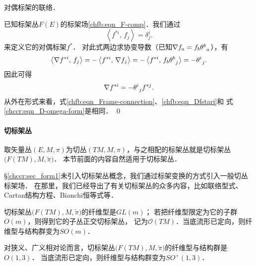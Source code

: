 \begin{example}
    对偶标架的联络．
\end{example}
已知标架丛$F(E)$的标架场\eqref{chfb:eqn_F-comp}．我们通过
\begin{equation}
    \left< f^{*i} ,\, f_j\right> =\delta^i_j .
\end{equation}
来定义它的对偶标架$f^{*}$．
对此式两边求协变导数（已知$\nabla f_a  =f_b \theta_{\hphantom{a}a}^{b}$），有
\begin{equation}
    \left< \nabla f^{*i} ,\, f_j\right> = - \left< f^{*i} ,\, \nabla f_j\right>
    =- \left< f^{*i} ,\, f_b \theta_{\hphantom{a}j}^{b} \right>
    =- \theta_{\hphantom{j}j}^{i}.
\end{equation} 
因此可得
\begin{equation}\label{chfb:eqn_Dfstari}
    \nabla f^{*i}=- \theta_{\hphantom{j}j}^{i} f^{*j} .
\end{equation}
从外在形式来看，式\eqref{chfb:eqn_Frame-connection}、\eqref{chfb:eqn_Dfstari}和
式\eqref{chccr:eqn_D-omega-form}是相同．
\qed







\paragraph{切标架丛}\label{chfb:sec_tangent-frame-bundles}
取矢量丛$(E,M,\pi)$为切丛$(TM,M,\pi)$，与之相配的标架丛就是切标架丛$\bigl(F(TM),M,\tilde{\pi}\bigr)$．
本节前面的内容自然适用于切标架丛．



\S\ref{chccr:sec_form1}未引入切标架丛概念，我们通过标架变换的方式引入一般切丛标架场．
在那里，我们已经导出了有关切标架丛的众多内容，比如联络型式、Cartan结构方程、Bianchi恒等式等．

切标架丛$\bigl(F(TM),M,\tilde{\pi}\bigr)$的纤维型是$GL(m)$；
若把纤维型限定为它的子群$O(m)$，则得到它的子丛{\heiti 正交切标架丛}，
记为$\mathcal{O}(TM)$．当底流形已定向，则纤维型与结构群变为$SO(m)$．

对狭义、广义相对论而言，切标架丛$\bigl(F(TM),M,\tilde{\pi}\bigr)$的纤维型与结构群是$O(1,3)$．
当底流形已定向，则纤维型与结构群变为$SO^{+}(1,3)$．



